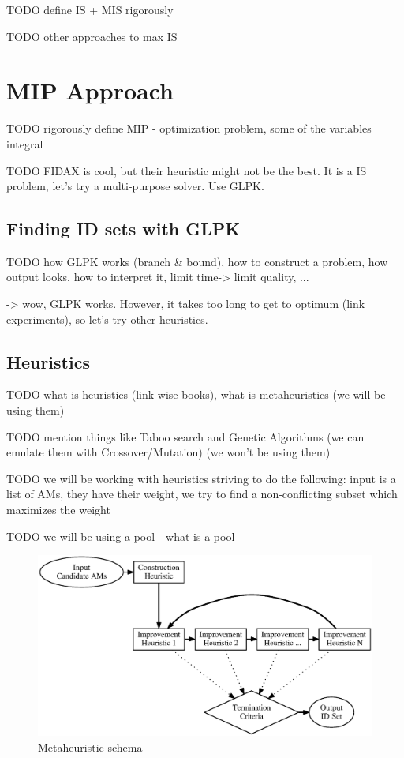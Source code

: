 \documentclass[a4paper,12pt,oneside]{report}
\begin{document}
TODO define IS + MIS rigorously

TODO other approaches to max IS

\chapter{MIP Approach}

TODO rigorously define MIP - optimization problem, some of the variables integral

TODO FIDAX is cool, but their heuristic might not be the best. It is a IS problem, let's try a multi-purpose solver. Use GLPK. 

\section{Finding ID sets with GLPK}

TODO how GLPK works (branch \& bound), how to construct a problem, how output looks, how to interpret it, limit time-> limit quality, ...
 
 -> wow, GLPK works. However, it takes too long to get to optimum (link experiments), so let's try other heuristics.
 
\section{Heuristics}

TODO what is heuristics (link wise books), what is metaheuristics (we will be using them)

TODO mention things like Taboo search and Genetic Algorithms (we can emulate them with Crossover/Mutation) (we won't be using them)

TODO we will be working with heuristics striving to do the following: input is a list of AMs, they have their weight, we try to find a non-conflicting subset which maximizes the weight

TODO we will be using a pool - what is a pool

\begin{figure}
  \caption{Metaheuristic schema}
  \label{image-metaheuristic}
  \centering
    \includegraphics[width=\textwidth]{images/metaheuristic.eps}
\end{figure}
\end{document}
